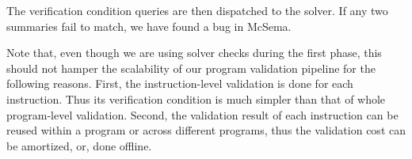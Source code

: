 The verification condition queries are then dispatched to the \Z solver. If any 
two summaries 
fail to match, we have found a bug in McSema.


Note that, even though we are using solver checks during the first phase, this
should not hamper the scalability of our program validation pipeline for 
the following
reasons.
First, the instruction-level validation is done for each instruction. 
Thus its verification condition is much simpler than that of whole program-level 
validation.
Second, the validation result of each instruction can be reused 
within a program  or across different programs, thus the validation cost can be 
amortized, or, done offline. 

